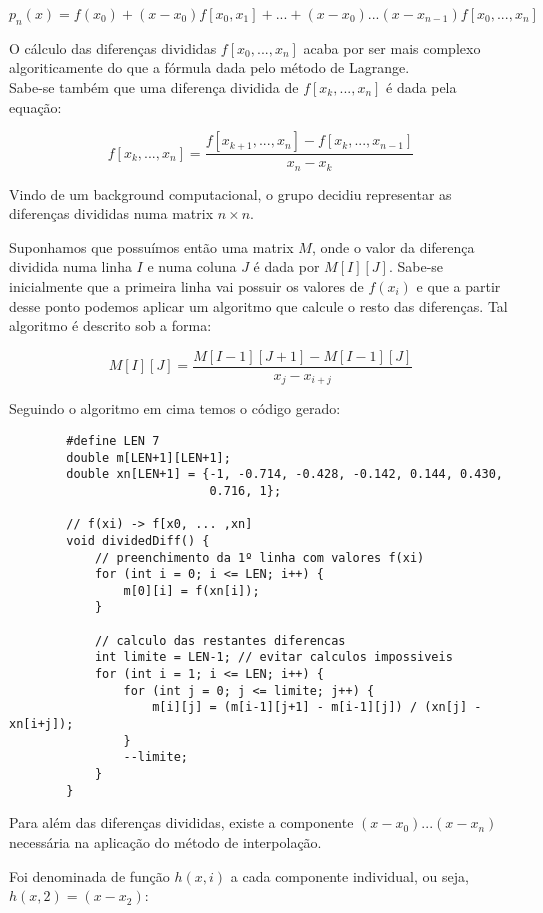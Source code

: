 \documentclass[12pt, letterpaper]{article}
\begin{document}
\begin{itemize}
    \[p_n(x) = f(x_0) + (x-x_0)f[x_0,x_1] + ... + (x-x_0)...(x-x_{n-1})f[x_0, ... , x_n]\]

    O cálculo das diferenças divididas $f[x_0, ... , x_n]$ acaba por ser mais complexo algoriticamente do que a fórmula dada pelo método de Lagrange. \\
    
    Sabe-se também que uma diferença dividida de $f[x_k, ... , x_n]$ é dada pela equação:

    \[f[x_k, ... , x_n] = \frac{f[x_{k+1}, ... , x_n] - f[x_k, ..., x_{n-1}]}{x_n - x_k}\]

    Vindo de um background computacional, o grupo decidiu representar as diferenças divididas numa matrix $n\times n$.

    Suponhamos que possuímos então uma matrix $M$, onde o valor da diferença dividida numa linha $I$ e numa coluna $J$ é dada por $M[I][J]$.
    Sabe-se inicialmente que a primeira linha vai possuir os valores de $f(x_i)$ e que a partir desse ponto podemos aplicar um algoritmo que calcule o resto das diferenças. Tal algoritmo é descrito sob a forma:

    \[M[I][J] = \frac{M[I-1][J+1] - M[I-1][J]}{x_j - x_{i+j}}\]

    Seguindo o algoritmo em cima temos o código gerado:
    \begin{verbatim}
        #define LEN 7
        double m[LEN+1][LEN+1];
        double xn[LEN+1] = {-1, -0.714, -0.428, -0.142, 0.144, 0.430, 
                            0.716, 1};
    
        // f(xi) -> f[x0, ... ,xn]
        void dividedDiff() {
            // preenchimento da 1º linha com valores f(xi)
            for (int i = 0; i <= LEN; i++) {
                m[0][i] = f(xn[i]);
            }
        
            // calculo das restantes diferencas
            int limite = LEN-1; // evitar calculos impossiveis
            for (int i = 1; i <= LEN; i++) {
                for (int j = 0; j <= limite; j++) {
                    m[i][j] = (m[i-1][j+1] - m[i-1][j]) / (xn[j] - xn[i+j]);
                }
                --limite;
            }
        }
    \end{verbatim}

    Para além das diferenças divididas, existe a componente $(x-x_0)...(x-x_n)$ necessária na aplicação do método de interpolação.

    Foi denominada de função $h(x,i)$ a cada componente individual, ou seja, $h(x, 2) = (x-x_2)$:


\end{itemize}
\end{document}
